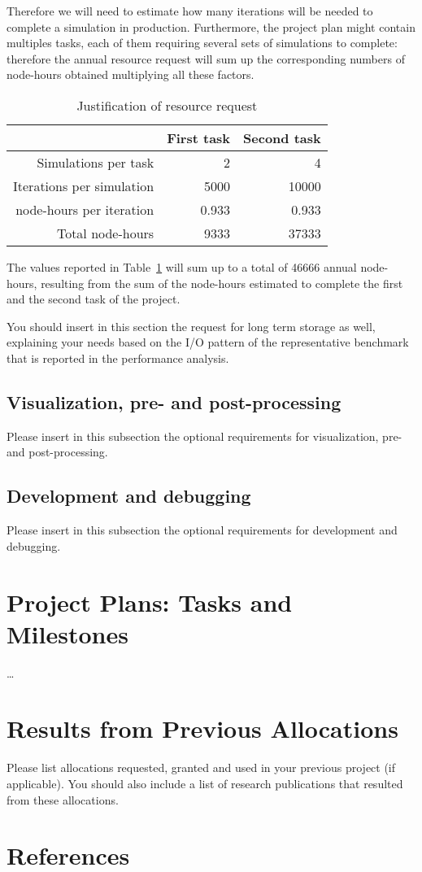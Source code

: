\documentclass[11pt]{article}
\begin{document}
Therefore we will need to estimate how many iterations will be needed to complete a simulation in production. 
Furthermore, the project plan might contain multiples tasks, each of them requiring several sets of simulations to complete:
therefore the annual resource request will sum up the corresponding numbers of node-hours obtained multiplying all these factors. 
\begin{table}[H]
 \begin{center}
  \begin{tabular}{@{}*3{r}@{}}
   \hline \hline
   & First task & Second task \\ 
   \hline \hline
   Simulations per task & 2 & 4 \\
   Iterations per simulation & 5000 & 10000 \\
   node-hours per iteration & 0.933 & 0.933 \\
   Total node-hours & 9333 & 37333 \\
   \hline \hline
  \end{tabular}
 \end{center}
 \caption{Justification of resource request}
 \label{table:resource_request}
\end{table}
The values reported in Table~\ref{table:resource_request} will sum up to a total of 46666 annual node-hours, resulting from the 
sum of the node-hours estimated to complete the first and the second task of the project.

You should insert in this section the request for long term storage as well, explaining your needs 
based on the I/O pattern of the representative benchmark that is reported in the performance analysis. 
 
\subsection{Visualization, pre- and post-processing}
Please insert in this subsection the optional requirements for visualization, pre- and post-processing.

\subsection{Development and debugging}
Please insert in this subsection the optional requirements for development and debugging. 

\section{Project Plans: Tasks and Milestones}
\ldots

\section{Results from Previous Allocations}
Please list allocations requested, granted and used in your previous project (if applicable). 
You should also include a list of research publications that resulted from these allocations.

\section*{References}


\end{document}
